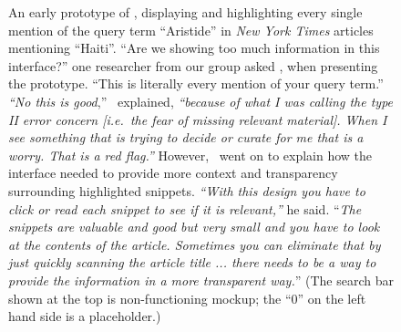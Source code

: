 
\begin{figure}[t!]
\centering
{}
  \caption[An early prototype of \ours]{  
  An early prototype of \ours, displaying and highlighting every single mention of the query term ``Aristide'' in \textit{New York Times} articles mentioning ``Haiti''. ``Are we showing too much information in this interface?'' one researcher from our group asked \ifour, when presenting the prototype. ``This is literally every mention of your query term.''
\textit{``No this is good},''  \ifour~explained, \textit{``because of what I was calling the type II error concern [i.e.\ the fear of missing relevant material]. When I see something that is trying to decide or curate for me that is a worry. That is a red flag.''} 
However, \ifour~went on to explain how the interface needed to provide more context and transparency surrounding highlighted snippets. 
\textit{``With this design you have to click or read each snippet to see if it is relevant,''} he said.  ``\textit{The snippets are valuable and good but very small and you have to look at the contents of the article. Sometimes you can eliminate that by just quickly scanning the article title ... there needs to be a way to provide the information in a more transparent way.}'' 
(The search bar shown at the top is non-functioning mockup; the ``0'' on the left hand side is a placeholder.)
}\label{f:prototype2}
\end{figure}

